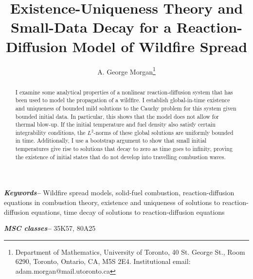 \documentclass[twosided, 12pt]{article}
\title{Existence-Uniqueness Theory and Small-Data Decay for a Reaction-Diffusion Model of Wildfire Spread}
\author{A. George Morgan\footnote{Department of Mathematics,
University of Toronto,
40 St. George St., Room 6290,
Toronto, Ontario, CA,
M5S 2E4. Institutional email: 
adam.morgan@mail.utoronto.ca}
}
\date{}
\numberwithin{equation}{section}
\theoremstyle{plain}
\providecommand{\keywords}[1]
{
  \small	
  \textbf{\textit{Keywords--}} #1
}
\providecommand{\msc}[1]
{
  \small	
  \textbf{\textit{MSC classes--}} #1
}
\begin{document}
\maketitle

 \begin{abstract}


 \noindent 
I examine some analytical properties of a nonlinear reaction-diffusion system that has been used to model the propagation of a wildfire. I establish global-in-time existence and uniqueness of bounded mild solutions to the Cauchy problem for this system given bounded initial data. In particular, this shows that the model does not allow for thermal blow-up. If the initial temperature and fuel density also satisfy certain integrability conditions, the $L^2$-norms of these global solutions are uniformly bounded in time. Additionally, I use a bootstrap argument to show that small initial temperatures give rise to solutions that decay to zero as time goes to infinity, proving the existence of initial states that do not develop into travelling combustion waves. 
  \end{abstract}

\noindent
\keywords{Wildfire spread models, solid-fuel combustion, reaction-diffusion equations in combustion theory, existence and uniqueness of solutions to reaction-diffusion equations, time decay of solutions to reaction-diffusion equations}

\noindent
\msc{35K57, 80A25}

\end{document}
